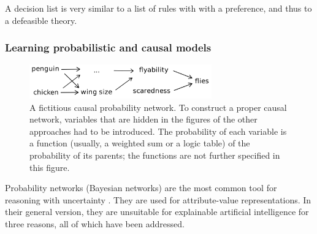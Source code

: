 A decision list is very similar to a list of rules with with a preference, and thus to a defeasible theory. %

\subsubsection{Learning probabilistic and causal models}

\begin{figure}[htb]
        \centering
        \includegraphics[width=0.7\textwidth]{images/causal-net.png}
        \caption{A fictitious causal probability network. To construct a proper causal network, variables that are hidden in the figures of the other approaches had to be introduced. The probability of each variable is a function (usually, a weighted sum or a logic table) of the probability of its parents; the functions are not further specified in this figure.}
        \label{fig:causal-network}
\end{figure}

Probability networks (Bayesian networks) are the most common tool for reasoning with uncertainty \citep[ch.~14.2]{russellArtificialIntelligenceModern2010}. They are used for attribute-value representations. In their general version, they are unsuitable for explainable artificial intelligence for three reasons, all of which have been addressed.

